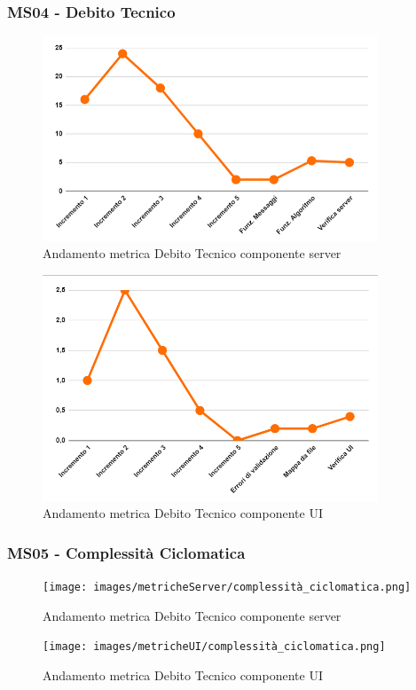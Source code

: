 \subsubsection{MS04 - Debito Tecnico}
\begin{figure}[H]
	\centering
	\includegraphics[width=10cm]{images/metricheServer/debito_tecnico.png}
	\caption{Andamento metrica Debito Tecnico componente server}
\end{figure}
\begin{figure}[H]
	\centering
	\includegraphics[width=10cm]{images/metricheUI/debito_tecnico.png}
	\caption{Andamento metrica Debito Tecnico componente UI}
	
\end{figure}

\subsubsection{MS05 - Complessità Ciclomatica}

\begin{figure}[H]
	\centering
	\texttt{[image: images/metricheServer/complessità\_ciclomatica.png]}
	\caption{Andamento metrica Debito Tecnico componente server}
\end{figure}
\begin{figure}[H]
	\centering
	\texttt{[image: images/metricheUI/complessità\_ciclomatica.png]}
	\caption{Andamento metrica Debito Tecnico componente UI}
\end{figure}

